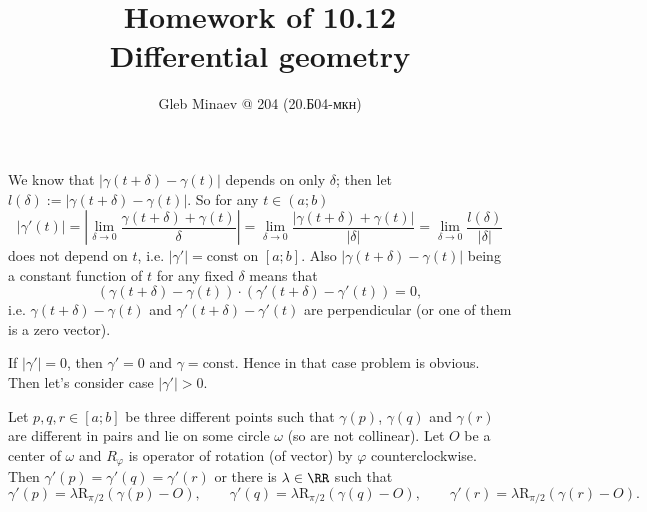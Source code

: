 \documentclass[12pt,a4paper]{article}
\title{Homework of 10.12\\Differential geometry}
\author{Gleb Minaev @ 204 (20.Б04-мкн)}
\date{}
\newcommand{\const}{\mathrm{const}}
\newcommand{\R}{\mathrm{R}}
\begin{document}
    \maketitle

    \begin{problem}{60}
        We know that $|\gamma(t + \delta) - \gamma(t)|$ depends on only $\delta$; then let $l(\delta) := |\gamma(t + \delta) - \gamma(t)|$. So for any $t \in (a; b)$
        \[
            |\gamma'(t)|
            = \left|\lim_{\delta \to 0} \frac{\gamma(t+\delta) + \gamma(t)}{\delta}\right|
            = \lim_{\delta \to 0} \frac{|\gamma(t+\delta) + \gamma(t)|}{|\delta|}
            = \lim_{\delta \to 0} \frac{l(\delta)}{|\delta|}
        \]
        does not depend on $t$, i.e. $|\gamma'| = \const$ on $[a; b]$. Also $|\gamma(t + \delta) - \gamma(t)|$ being a constant function of $t$ for any fixed $\delta$ means that
        \[(\gamma(t + \delta) - \gamma(t)) \cdot (\gamma'(t + \delta) - \gamma'(t)) = 0,\]
        i.e. $\gamma(t + \delta) - \gamma(t)$ and $\gamma'(t + \delta) - \gamma'(t)$ are perpendicular (or one of them is a zero vector).

        If $|\gamma'| = 0$, then $\gamma' = 0$ and $\gamma = \const$. Hence in that case problem is obvious. Then let's consider case $|\gamma'| > 0$.

        \begin{lemma}
            Let $p, q, r \in [a; b]$ be three different points such that $\gamma(p)$, $\gamma(q)$ and $\gamma(r)$ are different in pairs and lie on some circle $\omega$ (so are not collinear). Let $O$ be a center of $\omega$ and $R_\varphi$ is operator of rotation (of vector) by $\varphi$ counterclockwise. Then $\gamma'(p) = \gamma'(q) = \gamma'(r)$ or there is $\lambda \in \RR$ such that
            \[
                \gamma'(p) = \lambda \R_{\pi/2}(\gamma(p) - O),
                \qquad
                \gamma'(q) = \lambda \R_{\pi/2}(\gamma(q) - O),
                \qquad
                \gamma'(r) = \lambda \R_{\pi/2}(\gamma(r) - O).
            \]
        \end{lemma}


\end{problem}
\end{document}
